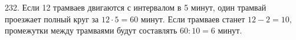 232. Если 12 трамваев двигаются с интервалом в 5 минут, один трамвай проезжает полный круг за $12\cdot5=60$ минут. Если трамваев станет $12-2=10,$ промежутки между трамваями будут составлять $60:10=6$ минут.\\
